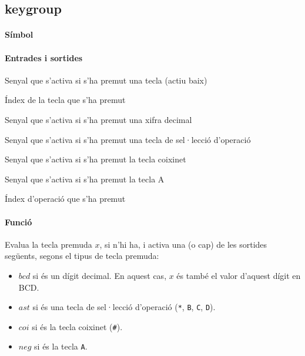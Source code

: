 \subsection{\label{sub:\projectname-keygroup} \textsf{keygroup}}

\paragraph{Símbol}

\begin{center}  \end{center}

\paragraph{Entrades i sortides}

\begin{where}
\item[\nodenamebit{nkey}] Senyal que s'activa si s'ha premut una tecla (actiu baix)
\item[\nodenamerange{x}{3}{0}] Índex de la tecla que s'ha premut
\item[\nodenamebit{bcd}] Senyal que s'activa si s'ha premut una xifra decimal
\item[\nodenamebit{ast}] Senyal que s'activa si s'ha premut una tecla de sel·lecció d'operació
\item[\nodenamebit{coi}] Senyal que s'activa si s'ha premut la tecla coixinet
\item[\nodenamebit{coi}] Senyal que s'activa si s'ha premut la tecla A
\item[\nodenamerange{selop}{1}{0}] Índex d'operació que s'ha premut
\end{where}

\paragraph{Funció}

Evalua la tecla premuda $x$, si n'hi ha, i activa una (o cap) de les sortides següents,
segons el tipus de tecla premuda:

\begin{itemize}
\item $bcd$ si és un dígit decimal. En aquest cas, $x$ és també
el valor d'aquest dígit en BCD.
\item $ast$ si és una tecla de sel·lecció d'operació (\texttt{*}, \texttt{B}, \texttt{C}, \texttt{D}).
\item $coi$ si és la tecla coixinet (\texttt{\#}).
\item $neg$ si és la tecla \texttt{A}.
\end{itemize}


